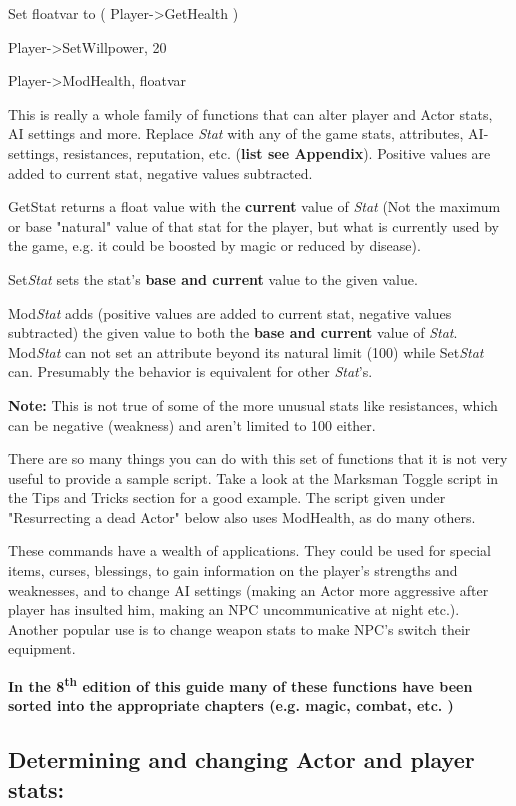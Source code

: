 \documentclass[
]{article}
\begin{document}
Set floatvar to ( Player-\textgreater GetHealth )

Player-\textgreater SetWillpower, 20

Player-\textgreater ModHealth, floatvar

This is really a whole family of functions that can alter player and
Actor stats, AI settings and more. Replace \emph{Stat} with any of the
game stats, attributes, AI-settings, resistances, reputation, etc.
(\textbf{list see Appendix}). Positive values are added to current stat,
negative values subtracted.

GetStat returns a float value with the \textbf{current} value of
\emph{Stat} (Not the maximum or base "natural" value of that stat for
the player, but what is currently used by the game, e.g. it could be
boosted by magic or reduced by disease).

Set\emph{Stat} sets the stat's \textbf{base and current} value to the
given value.

Mod\emph{Stat} adds (positive values are added to current stat, negative
values subtracted) the given value to both the \textbf{base and current}
value of \emph{Stat}. Mod\emph{Stat} can not set an attribute beyond its
natural limit (100) while Set\emph{Stat} can. Presumably the behavior is
equivalent for other \emph{Stat}'s.

\textbf{Note:} This is not true of some of the more unusual stats like
resistances, which can be negative (weakness) and aren't limited to 100
either.

There are so many things you can do with this set of functions that it
is not very useful to provide a sample script. Take a look at the
Marksman Toggle script in the Tips and Tricks section for a good
example. The script given under "Resurrecting a dead Actor" below also
uses ModHealth, as do many others.

These commands have a wealth of applications. They could be used for
special items, curses, blessings, to gain information on the player's
strengths and weaknesses, and to change AI settings (making an Actor
more aggressive after player has insulted him, making an NPC
uncommunicative at night etc.). Another popular use is to change weapon
stats to make NPC's switch their equipment.

\textbf{In the 8\textsuperscript{th} edition of this guide many of these
functions have been sorted into the appropriate chapters (e.g. magic,
combat, etc. )}

\hypertarget{determining-and-changing-actor-and-player-stats}{%
\subsection{\texorpdfstring{\hfill\break
Determining and changing Actor and player
stats:}{ Determining and changing Actor and player stats:}}\label{determining-and-changing-actor-and-player-stats}}
\end{document}
